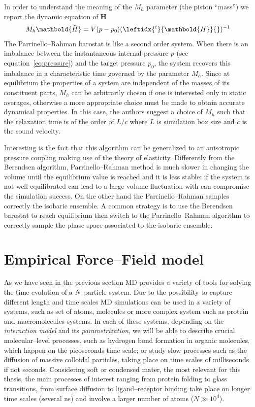 In order to understand the meaning of the $M_h$ parameter (the piston ``mass'') we report the dynamic equation of $\mathbold H$
\begin{equation*}
	M_h \mathbold{\ddot H} = V (p - p_0) (\leftidx{^t}{\mathbold{H}}{})^{-1}
\end{equation*}
The Parrinello--Rahman barostat is like a second order system. When there is an imbalance between the
instantaneous internal pressure $p$ (see equation~\eqref{eq:pressure}) and the target pressure $p_0$, the system
recovers this imbalance in a characteristic time governed by the parameter $M_h$. Since at equilibrium the
properties of a system are independent of the masses of its constituent parts, $M_h$ can be arbitrarily chosen if
one is interested only in static averages, otherwise a more appropriate choice must be made to obtain accurate
dynamical properties. In this case, the authors suggest a choice of $M_h$ such that the relaxation time is of the
order of $L/c$ where $L$ is simulation box size and $c$ is the sound velocity.

Interesting is the fact that this algorithm can be generalized to an anisotropic pressure coupling making use of
the theory of elasticity. Differently from the Berendsen algorithm, Parrinello--Rahman method is much slower in
changing the volume until the equilibrium value is reached and it is less stable: if the system is not well
equilibrated can lead to a large volume fluctuation with can compromise the simulation success. On the other hand
the Parrinello--Rahman samples correctly the isobaric ensemble. A common strategy is to use the Berendsen
barostat to reach equilibrium then switch to the Parrinello--Rahman algorithm to correctly sample the phase space
associated to the isobaric ensemble.


\newpage
\section{Empirical Force--Field model}
\label{sec:EmpiricalFF}
As we have seen in the previous section \ac{MD} provides a variety of tools for solving the time evolution of a
$N$--particle system. Due to the possibility to capture different length and time scales \ac{MD} simulations can
be used in a variety of systems, such as set of atoms, molecules or more complex system such as protein and
macromolecules systems. In each of these systems, depending on the \textit{interaction model} and its
\textit{parametrization}, we will be able to describe crucial molecular--level processes, such as hydrogen bond
formation in organic molecules, which happen on the picoseconds time scale; or study slow processes such as the
diffusion of massive colloidal particles, taking place on time scales of milliseconds if not seconds. Considering soft or condensed mater, the most relevant for this thesis, the main processes of interest
ranging from protein folding to glass transitions, from surface diffusion to ligand--receptor binding take place
on longer time scales (several ns) and involve a larger number of atoms ($N \gg 10^4$).

